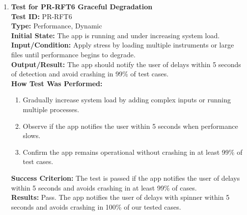 \documentclass[12pt, titlepage]{article}
\begin{document}
\begin{enumerate}
    \item \textbf{Test for PR-RFT6 Graceful Degradation} \\
      \newline
      \textbf{Test ID:} PR-RFT6 \\
      \textbf{Type:} Performance, Dynamic \\
      \textbf{Initial State:} The app is running and under increasing system load. \\
      \textbf{Input/Condition:} Apply stress by loading multiple instruments or large files until performance begins to degrade. \\
      \textbf{Output/Result:} The app should notify the user of delays within 5 seconds of detection and avoid crashing in 99\% 
      of test cases. \\
      \textbf{How Test Was Performed:}
      \begin{enumerate}
          \item Gradually increase system load by adding complex inputs or running multiple processes.
          \item Observe if the app notifies the user within 5 seconds when performance slows.
          \item Confirm the app remains operational without crashing in at least 99\% of test cases.
      \end{enumerate}
      \textbf{Success Criterion:} The test is passed if the app notifies the user of delays within 5 seconds and avoids crashing in at least 99\% of cases.\\
      \textbf{Results:} Pass. The app notifies the user of delays with spinner within 5 seconds and avoids crashing in 100\% of our tested cases.\\


\end{enumerate}
\end{document}
